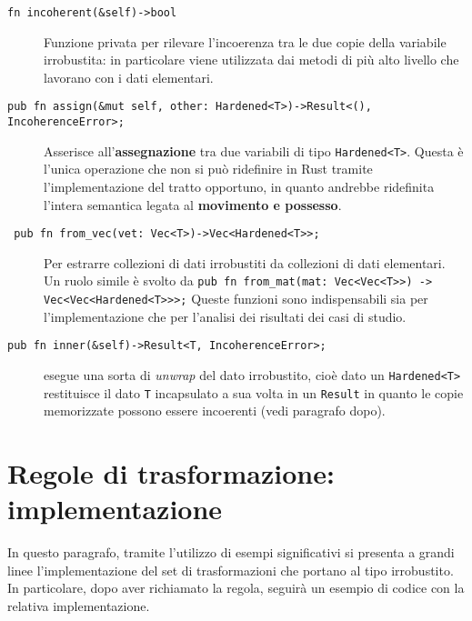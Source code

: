 \begin{description}
    \item[\texttt{fn incoherent(\&self)->bool}] Funzione privata per rilevare l'incoerenza tra le due copie della variabile irrobustita: in particolare viene utilizzata dai metodi di più alto livello che lavorano con i dati elementari.
    \item[\texttt{pub fn assign(\&mut self, other: Hardened<T>)->Result<(), IncoherenceError>;}]\quad \newline Asserisce all'\textbf{assegnazione} tra due variabili di tipo \texttt{Hardened<T>}. Questa è l'unica operazione che non si può ridefinire in Rust tramite l'implementazione del tratto opportuno, in quanto andrebbe ridefinita l'intera semantica legata al \textbf{movimento e possesso}.
    \item[\texttt{ pub fn from\_vec(vet: Vec<T>)->Vec<Hardened<T>>;} ] Per estrarre collezioni di dati irrobustiti da collezioni di dati elementari. Un ruolo simile è svolto da \newline \texttt{pub fn from\_mat(mat: Vec<Vec<T>>) -> Vec<Vec<Hardened<T>>>;} Queste funzioni sono indispensabili sia per l'implementazione che per l'analisi dei risultati dei casi di studio.
    \item[\texttt{pub fn inner(\&self)->Result<T, IncoherenceError>;}] esegue una sorta di \textit{unwrap} del dato irrobustito, cioè dato un \texttt{Hardened<T>} restituisce il dato \texttt{T} incapsulato a sua volta in un \texttt{Result} in quanto le copie memorizzate possono essere incoerenti (vedi paragrafo dopo).
\end{description}

\section{Regole di trasformazione: implementazione}\label{sec:transf_impl}
In questo paragrafo, tramite l'utilizzo di esempi significativi si presenta a grandi linee l'implementazione del set di trasformazioni che portano al tipo irrobustito. In particolare, dopo aver richiamato la regola, seguirà un esempio di codice con la relativa implementazione.\\

\noindent
\begin{center}
%
\end{center}

